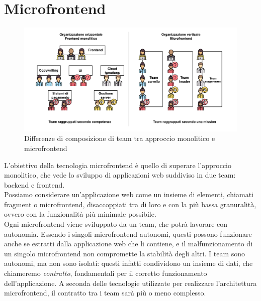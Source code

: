 \chapter{Microfrontend}\label{ch:chapter1}
\begin{figure}[H]
  \centering
  \includegraphics[width=140mm]{img/schema_microfrontend}
  \caption{Differenze di composizione di team tra approccio monolitico e microfrontend}
\end{figure}
L'obiettivo della tecnologia microfrontend è quello di superare l'approccio monolitico, che vede
lo sviluppo di applicazioni web suddiviso in due team: backend e frontend.
\\
Possiamo considerare un'applicazione web come un insieme
di elementi, chiamati fragment o microfrontend, disaccoppiati tra di loro
e con la più bassa granuralità, ovvero con la funzionalità più minimale possibile.
\\Ogni microfrontend viene sviluppato da un team, che potrà lavorare con autonomia. 
Essendo i singoli microfrontend autonomi,
questi possono funzionare anche se estratti dalla applicazione web che li contiene,
 e il malfunzionamento di un singolo microfrontend
non compromette la stabilità degli altri.
I team sono autonomi, ma non sono isolati: questi infatti condividono un insieme di dati, che
chiameremo \emph{contratto},
fondamentali per il corretto funzionamento dell'applicazione. A seconda delle tecnologie utilizzate
per realizzare l'architettura microfrontend, il contratto tra i team sarà più o meno complesso.

